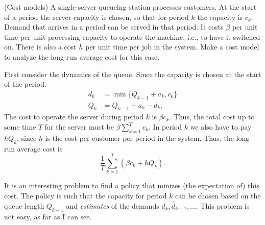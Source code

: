 \begin{question}(Cost models) A single-server queueing station
  processes customers. At the start of a period the server capacity is
  chosen, so that for period $k$ the capacity is $c_k$. Demand that
  arrives in a period can be served in that period. It costs $\beta$
  per unit time per unit processing capacity to operate the machine,
  i.e., to have it switched on. There is also a cost $h$ per unit time
  per job in the system. Make a cost model to analyze the long-run
  average cost for this case.
  \begin{solution}
First consider the dynamics of the queue. Since the capacity is chosen at the start of the period:
\begin{align*}
  d_k &= \min\{Q_{k-1}+a_k, c_k\} \\
Q_k &= Q_{k-1}+a_k - d_k.
\end{align*}
The cost to operate the server during period $k$ is $\beta c_k$.
Thus, the total cost up to some time $T$ for the server must be
$\beta \sum_{k=1}^T c_k$. In period $k$ we also have to pay $h Q_k$,
since $h$ is the cost per customer per period in the system. Thus, the
long-run average cost is
    \begin{equation*}
      \frac 1T\sum_{k=1}^T \left(\beta c_k + h Q_k\right).
    \end{equation*}

    It is an interesting problem to find a policy that minizes (the
    expectation of) this cost. The policy is such that the capacity
    for period $k$ can be chosen based on the queue length $Q_{k-1}$
    and \emph{estimates} of the demands
    $\hat d_k, \hat d_{k+1}, \ldots$. This problem is not easy, as far as I can see. 

  \end{solution}
\end{question}


